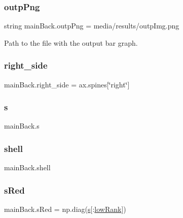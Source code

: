 \subsubsection{\texorpdfstring{outp\+Png}{outpPng}}
{\footnotesize\ttfamily string main\+Back.\+outp\+Png = \textquotesingle{}media/results/outp\+Img.\+png\textquotesingle{}}



Path to the file with the output bar graph. 

\mbox{\label{namespacemain_back_a89f7ed0e1ede7fd343133ceeede73230}} 
\subsubsection{\texorpdfstring{right\+\_\+side}{right\_side}}
{\footnotesize\ttfamily main\+Back.\+right\+\_\+side = ax.\+spines\mbox{[}\char`\"{}right\char`\"{}\mbox{]}}

\mbox{\label{namespacemain_back_a6b0f2224c369d3ec5bf6a3c7bcf3b60d}} 
\subsubsection{\texorpdfstring{s}{s}}
{\footnotesize\ttfamily main\+Back.\+s}

\mbox{\label{namespacemain_back_a30f0d83c5715d2fa96d14b3fd6a7fbd0}} 
\subsubsection{\texorpdfstring{shell}{shell}}
{\footnotesize\ttfamily main\+Back.\+shell}

\mbox{\label{namespacemain_back_a00584a33a7cf37843fda73a71092ef9d}} 
\subsubsection{\texorpdfstring{s\+Red}{sRed}}
{\footnotesize\ttfamily main\+Back.\+s\+Red = np.\+diag(\hyperlink{namespacemain_back_a6b0f2224c369d3ec5bf6a3c7bcf3b60d}{s}\mbox{[}\+:\hyperlink{namespacemain_back_aee2ac20a3d81f9f6762e47cad7268a32}{low\+Rank}\mbox{]})}



